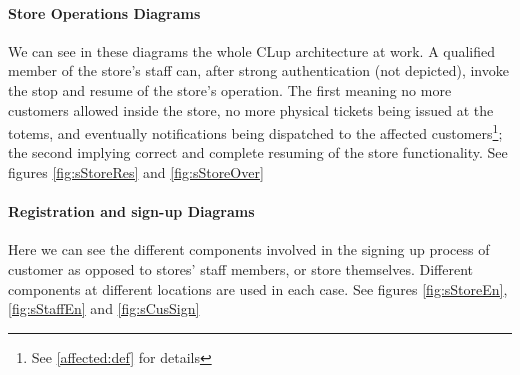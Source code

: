 

\paragraph{Store Operations Diagrams}
We can see in these diagrams the whole CLup architecture at work. A qualified member of the store's staff can, after strong authentication (not depicted), invoke the stop and resume of the store's operation. The first meaning no more customers allowed inside the store, no more physical tickets being issued at the totems, and eventually notifications being dispatched to the affected customers\footnote{See \ref{affected:def} \space for details}; the second implying correct and complete resuming of the store functionality. See figures \ref{fig:sStoreRes} \space and \ref{fig:sStoreOver}

\paragraph{Registration and sign-up Diagrams}
Here we can see the different components involved in the signing up process of customer as opposed to stores' staff members, or store themselves. Different components at different locations are used in each case. See figures \ref{fig:sStoreEn}, \ref{fig:sStaffEn} and \ref{fig:sCusSign}


